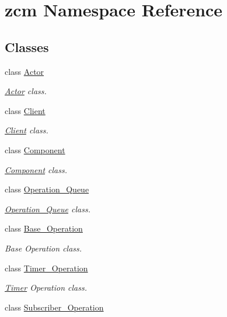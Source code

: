 \hypertarget{namespacezcm}{\section{zcm Namespace Reference}
\label{namespacezcm}
}
\subsection*{Classes}
\begin{DoxyCompactItemize}
\item 
class \hyperlink{classzcm_1_1Actor}{Actor}
\begin{DoxyCompactList}\small\item\em \hyperlink{classzcm_1_1Actor}{Actor} class. \end{DoxyCompactList}\item 
class \hyperlink{classzcm_1_1Client}{Client}
\begin{DoxyCompactList}\small\item\em \hyperlink{classzcm_1_1Client}{Client} class. \end{DoxyCompactList}\item 
class \hyperlink{classzcm_1_1Component}{Component}
\begin{DoxyCompactList}\small\item\em \hyperlink{classzcm_1_1Component}{Component} class. \end{DoxyCompactList}\item 
class \hyperlink{classzcm_1_1Operation__Queue}{Operation\-\_\-\-Queue}
\begin{DoxyCompactList}\small\item\em \hyperlink{classzcm_1_1Operation__Queue}{Operation\-\_\-\-Queue} class. \end{DoxyCompactList}\item 
class \hyperlink{classzcm_1_1Base__Operation}{Base\-\_\-\-Operation}
\begin{DoxyCompactList}\small\item\em Base Operation class. \end{DoxyCompactList}\item 
class \hyperlink{classzcm_1_1Timer__Operation}{Timer\-\_\-\-Operation}
\begin{DoxyCompactList}\small\item\em \hyperlink{classzcm_1_1Timer}{Timer} Operation class. \end{DoxyCompactList}\item 
class \hyperlink{classzcm_1_1Subscriber__Operation}{Subscriber\-\_\-\-Operation}

\end{DoxyCompactItemize}
